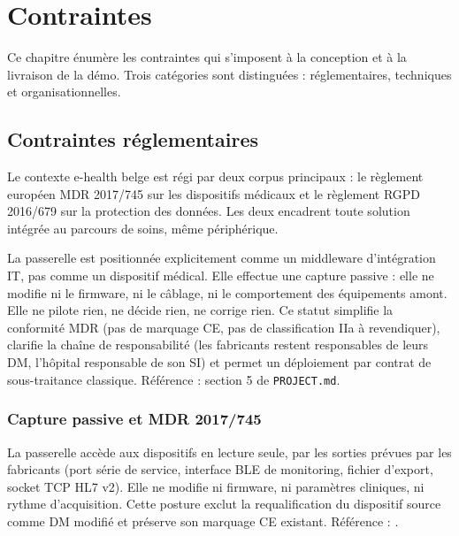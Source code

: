 \chapter{Contraintes}
\label{ch:contraintes}

Ce chapitre énumère les contraintes qui s'imposent à la conception et à la livraison de la démo. Trois catégories sont distinguées : réglementaires, techniques et organisationnelles.

\section{Contraintes réglementaires}
\label{sec:contraintes-reglementaires}

Le contexte e-health belge est régi par deux corpus principaux : le règlement européen MDR 2017/745 sur les dispositifs médicaux et le règlement RGPD 2016/679 sur la protection des données. Les deux encadrent toute solution intégrée au parcours de soins, même périphérique.

\begin{bridgekey}
La passerelle est positionnée explicitement comme un middleware d'intégration IT, pas comme un dispositif médical. Elle effectue une capture passive : elle ne modifie ni le firmware, ni le câblage, ni le comportement des équipements amont. Elle ne pilote rien, ne décide rien, ne corrige rien. Ce statut simplifie la conformité MDR (pas de marquage CE, pas de classification IIa à revendiquer), clarifie la chaîne de responsabilité (les fabricants restent responsables de leurs DM, l'hôpital responsable de son SI) et permet un déploiement par contrat de sous-traitance classique. Référence : section 5 de \texttt{PROJECT.md}.
\end{bridgekey}

\subsection{Capture passive et MDR 2017/745}
\label{subsec:mdr-capture-passive}

La passerelle accède aux dispositifs en lecture seule, par les sorties prévues par les fabricants (port série de service, interface BLE de monitoring, fichier d'export, socket TCP HL7 v2). Elle ne modifie ni firmware, ni paramètres cliniques, ni rythme d'acquisition. Cette posture exclut la requalification du dispositif source comme DM modifié et préserve son marquage CE existant. Référence : \cite{mdr_2017_745}.

